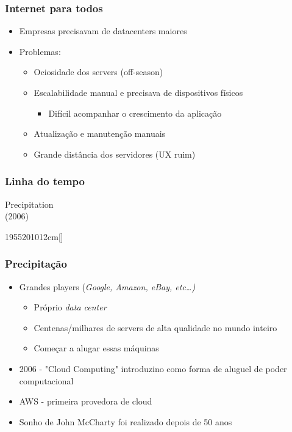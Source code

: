 \begin{frame}
	\frametitle{Internet para todos}
	\begin{itemize}
		\item Empresas precisavam de datacenters maiores
		\item Problemas:
			\begin{itemize}
				\item Ociosidade dos servers (off-season)
				\item Escalabilidade manual e precisava de dispositivos físicos
					\begin{itemize}
						\item Difícil acompanhar o crescimento da aplicação
					\end{itemize}
				\item Atualização e manutenção manuais
				\item Grande distância dos servidores (UX ruim)
			\end{itemize}
	\end{itemize}
\end{frame}

\begin{frame}
	\frametitle{Linha do tempo}
	\begin{center}
		Precipitation \\
		(2006)
	\end{center}
	\hfill
	\begin{scriptsize}
	\begin{bf}
	\begin{center}
		\begin{chronology}[10]{1955}{2010}{12cm}[\textwidth]
			\color{lightgreen}
		\end{chronology}
	\end{center}
	\end{bf}
	\end{scriptsize}
\end{frame}

\begin{frame}[allowframebreaks]
	\frametitle{Precipitação}
	\begin{itemize}
		\item Grandes players (\it{Google, Amazon, eBay, etc\dots})
			\begin{itemize}
				\item Próprio \it{data center}
				\item Centenas/milhares de servers de alta qualidade no mundo inteiro
				\item Começar a alugar essas máquinas
			\end{itemize}
		\item 2006 - "Cloud Computing" introduzino como forma de aluguel de poder computacional
		\item AWS - primeira provedora de cloud
		\item Sonho de John McCharty foi realizado depois de 50 anos
	\end{itemize}
\end{frame}

